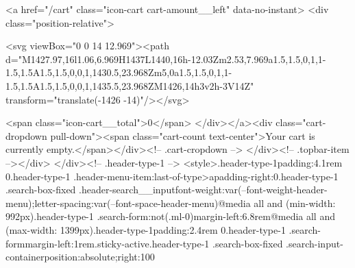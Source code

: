 {{{{{<a href="/cart" class="icon-cart cart-amount__left" data-no-instant>
    <div class="position-relative">
      
<svg viewBox="0 0 14 12.969"><path d="M1427.97,16l1.06,6.969H1437L1440,16h-12.03Zm2.53,7.969a1.5,1.5,0,1,1-1.5,1.5A1.5,1.5,0,0,1,1430.5,23.968Zm5,0a1.5,1.5,0,1,1-1.5,1.5A1.5,1.5,0,0,1,1435.5,23.968ZM1426,14h3v2h-3V14Z" transform="translate(-1426 -14)"/></svg>


      <span class="icon-cart__total">0</span>
    </div></a><div class="cart-dropdown pull-down"><span class="cart-count text-center">Your cart is currently empty.</span></div><!-- .cart-cropdown -->
      </div><!-- .topbar-item --></div>
</div><!-- .header-type-1 -->
<style>.header-type-1{padding:4.1rem 0}.header-type-1 .header-menu-item:last-of-type>a{padding-right:0}.header-type-1 .search-box-fixed .header-search__input{font-weight:var(--font-weight-header-menu);letter-spacing:var(--font-space-header-menu)}@media all and (min-width: 992px){.header-type-1 .search-form:not(.ml-0){margin-left:6.8rem}}@media all and (max-width: 1399px){.header-type-1{padding:2.4rem 0}.header-type-1 .search-form{margin-left:1rem}}.sticky-active.header-type-1 .search-box-fixed .search-input-container{position:absolute;right:100%
}}}}}}

